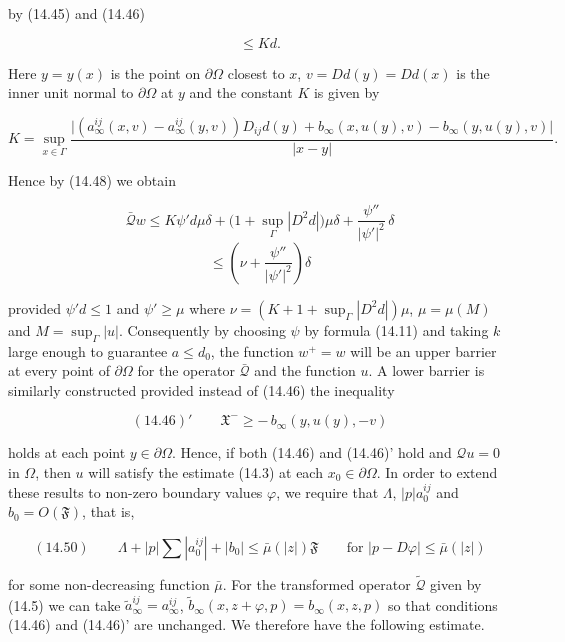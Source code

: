 by (14.45) and (14.46)

\[
\le Kd.
\]

Here $y=y(x)$ is the point on $\partial\Omega$ closest to $x$, $v=Dd(y)=Dd(x)$ is the inner unit
normal to $\partial\Omega$ at $y$ and the constant $K$ is given by

\begin{equation}
\tag{14.49}
K=\sup_{x\in\Gamma}\frac{\bigl|(a^{ij}_{\infty}(x,v)-a^{ij}_{\infty}(y,v))D_{ij}d(y)+b_{\infty}(x,u(y),v)-b_{\infty}(y,u(y),v)\bigr|}{|x-y|}.
\end{equation}





Hence by (14.48) we obtain

\[
\bar{\mathcal Q}w \le K\psi' d\mu\delta + \bigl(1+\sup_{\Gamma}|D^2 d|\bigr)\mu\delta
  + \frac{\psi''}{|\psi'|^2}\,\delta
\]
\[
\le \left(\nu+\frac{\psi''}{|\psi'|^2}\right)\delta
\]

provided $\psi'd\le 1$ and $\psi'\ge \mu$ where $\nu=(K+1+\sup_{\Gamma}|D^2 d|)\mu$, $\mu=\mu(M)$ and
$M=\sup_{\Gamma}|u|$. Consequently by choosing $\psi$ by formula (14.11) and taking $k$ large enough to guarantee
$a\le d_0$, the function $w^+=w$ will be an upper barrier at every point of $\partial\Omega$ for the operator
$\bar{\mathcal Q}$ and the function $u$. A lower barrier is similarly constructed provided instead of (14.46) the
inequality

\[
(14.46)'\qquad \mathfrak X^- \ge -\,b_\infty(y,u(y),-v)
\]

holds at each point $y\in\partial\Omega$. Hence, if both (14.46) and (14.46)' hold and $\mathcal Q u=0$ in $\Omega$,
then $u$ will satisfy the estimate (14.3) at each $x_0\in\partial\Omega$. In order to extend these results to
non-zero boundary values $\varphi$, we require that $\Lambda$, $|p|a_0^{ij}$ and $b_0=O(\mathfrak F)$, that is,

\[
(14.50)\qquad \Lambda + |p| \sum |a_0^{ij}| + |b_0|\le \bar\mu(|z|)\mathfrak F
 \qquad \text{for } |p-D\varphi|\le \bar\mu(|z|)
\]

for some non-decreasing function $\bar\mu$. For the transformed operator $\tilde{\mathcal Q}$ given by (14.5) we
can take $\tilde a_\infty^{ij}=a_\infty^{ij}$, $\tilde b_\infty(x,z+\varphi,p)=b_\infty(x,z,p)$ so that conditions
(14.46) and (14.46)' are unchanged. We therefore have the following estimate.

\medskip

